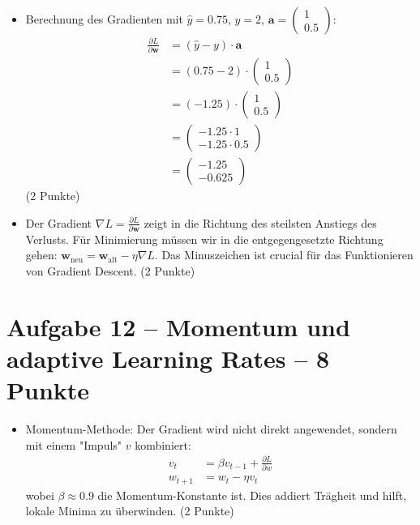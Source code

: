 \begin{itemize}
\item [d)] Berechnung des Gradienten mit $\hat{y} = 0.75$, $y = 2$, $\mathbf{a} = \begin{pmatrix} 1 \\ 0.5 \end{pmatrix}$:
\begin{align*}
\frac{\partial L}{\partial \mathbf{w}} &= (\hat{y} - y) \cdot \mathbf{a} \\
&= (0.75 - 2) \cdot \begin{pmatrix} 1 \\ 0.5 \end{pmatrix} \\
&= (-1.25) \cdot \begin{pmatrix} 1 \\ 0.5 \end{pmatrix} \\
&= \begin{pmatrix} -1.25 \cdot 1 \\ -1.25 \cdot 0.5 \end{pmatrix} \\
&= \begin{pmatrix} -1.25 \\ -0.625 \end{pmatrix}
\end{align*}
(2 Punkte)
\end{itemize}

\begin{itemize}
\item [e)] Der Gradient $\nabla L = \frac{\partial L}{\partial \mathbf{w}}$ zeigt in die Richtung des steilsten Anstiegs des Verlusts. Für Minimierung müssen wir in die entgegengesetzte Richtung gehen: $\mathbf{w}_{\text{neu}} = \mathbf{w}_{\text{alt}} - \eta \nabla L$. Das Minuszeichen ist crucial für das Funktionieren von Gradient Descent. (2 Punkte)
\end{itemize}

\newpage

\section*{Aufgabe 12 -- Momentum und adaptive Learning Rates -- 8 Punkte}

\begin{itemize}
\item [a)] Momentum-Methode: Der Gradient wird nicht direkt angewendet, sondern mit einem "Impuls" $v$ kombiniert:
\begin{align}
v_t &= \beta v_{t-1} + \frac{\partial L}{\partial w} \\
w_{t+1} &= w_t - \eta v_t
\end{align}
wobei $\beta \approx 0.9$ die Momentum-Konstante ist. Dies addiert Trägheit und hilft, lokale Minima zu überwinden. (2 Punkte)
\end{itemize}

